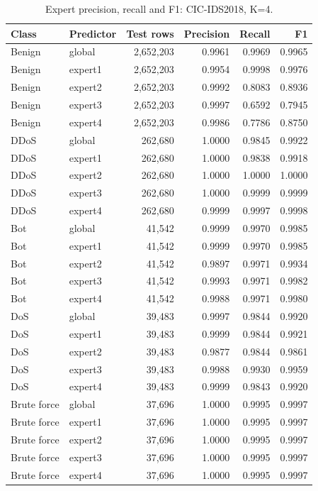 \begin{longtable}{llrrrr}
\caption{Expert precision, recall and F1: CIC-IDS2018, K=4.}\\
\toprule
Class & Predictor & Test rows & Precision & Recall & F1 \\
\midrule\endhead
Benign & global & 2,652,203 & 0.9961 & 0.9969 & 0.9965 \\
Benign & expert1 & 2,652,203 & 0.9954 & 0.9998 & 0.9976 \\
Benign & expert2 & 2,652,203 & 0.9992 & 0.8083 & 0.8936 \\
Benign & expert3 & 2,652,203 & 0.9997 & 0.6592 & 0.7945 \\
Benign & expert4 & 2,652,203 & 0.9986 & 0.7786 & 0.8750 \\
DDoS & global & 262,680 & 1.0000 & 0.9845 & 0.9922 \\
DDoS & expert1 & 262,680 & 1.0000 & 0.9838 & 0.9918 \\
DDoS & expert2 & 262,680 & 1.0000 & 1.0000 & 1.0000 \\
DDoS & expert3 & 262,680 & 1.0000 & 0.9999 & 0.9999 \\
DDoS & expert4 & 262,680 & 0.9999 & 0.9997 & 0.9998 \\
Bot & global & 41,542 & 0.9999 & 0.9970 & 0.9985 \\
Bot & expert1 & 41,542 & 0.9999 & 0.9970 & 0.9985 \\
Bot & expert2 & 41,542 & 0.9897 & 0.9971 & 0.9934 \\
Bot & expert3 & 41,542 & 0.9993 & 0.9971 & 0.9982 \\
Bot & expert4 & 41,542 & 0.9988 & 0.9971 & 0.9980 \\
DoS & global & 39,483 & 0.9997 & 0.9844 & 0.9920 \\
DoS & expert1 & 39,483 & 0.9999 & 0.9844 & 0.9921 \\
DoS & expert2 & 39,483 & 0.9877 & 0.9844 & 0.9861 \\
DoS & expert3 & 39,483 & 0.9988 & 0.9930 & 0.9959 \\
DoS & expert4 & 39,483 & 0.9999 & 0.9843 & 0.9920 \\
Brute force & global & 37,696 & 1.0000 & 0.9995 & 0.9997 \\
Brute force & expert1 & 37,696 & 1.0000 & 0.9995 & 0.9997 \\
Brute force & expert2 & 37,696 & 1.0000 & 0.9995 & 0.9997 \\
Brute force & expert3 & 37,696 & 1.0000 & 0.9995 & 0.9997 \\
Brute force & expert4 & 37,696 & 1.0000 & 0.9995 & 0.9997 \\

\end{longtable}
